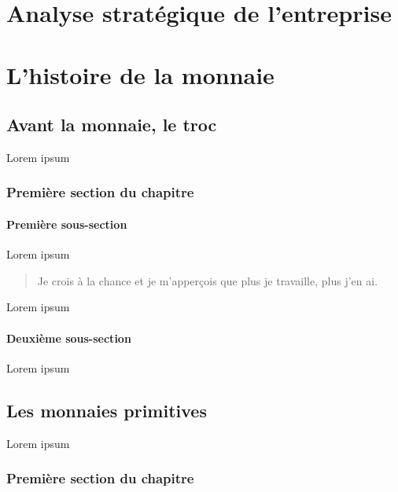 \documentclass{bredele} %
\begin{document}
    \clearemptydoublepage

    \clearemptydoublepage
    \mainmatter %

    \part[Analyse stratégique de l'entreprise]{Analyse stratégique de l'entreprise}

    \part[L'histoire de la monnaie]{L'histoire de la monnaie}

    \chapter[Avant la monnaie]{Avant la monnaie, le troc}

    Lorem ipsum

    \section{Première section du chapitre}

    \subsection{Première sous-section}

    Lorem ipsum

    \begin{quote}
    Je crois à la chance et je m'apperçois que plus je travaille, plus j'en ai.
    \end{quote}

    Lorem ipsum

    \subsection{Deuxième sous-section}

    Lorem ipsum

    \chapter[Les monnaies primitives]{Les monnaies primitives}

    Lorem ipsum

    \section{Première section du chapitre}
\end{document}
